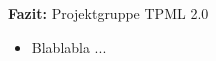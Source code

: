 {
  {\bf Fazit:} Projektgruppe \glqq TPML 2.0\grqq
  \begin{itemize}
    \item Blablabla ...
  \end{itemize}
}
